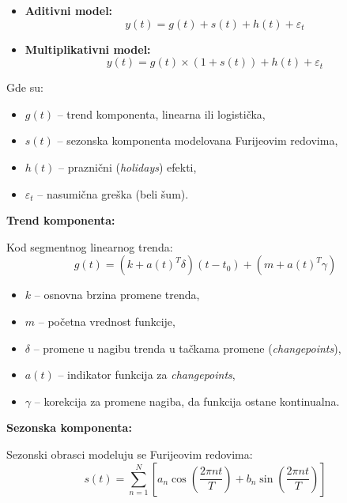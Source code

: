 \documentclass[12pt]{article}
\begin{document}
\begin{itemize}
    \item \textbf{Aditivni model:}
    \begin{equation}
        y(t) = g(t) + s(t) + h(t) + \varepsilon_t
    \end{equation}
    
    \item \textbf{Multiplikativni model:}
    \begin{equation}
        y(t) = g(t) \times (1 + s(t)) + h(t) + \varepsilon_t
    \end{equation}
\end{itemize}

Gde su:
\begin{itemize}
    \item $g(t)$ -- trend komponenta, linearna ili logistička,
    \item $s(t)$ -- sezonska komponenta modelovana Furijeovim redovima,
    \item $h(t)$ -- praznični (\textit{holidays}) efekti,
    \item $\varepsilon_t$ -- nasumična greška (beli šum).
\end{itemize}

\textbf{Trend komponenta:}

Kod segmentnog linearnog trenda:
\begin{equation}
g(t) = (k + a(t)^T \delta) (t - t_0) + (m + a(t)^T \gamma)
\end{equation}

\begin{itemize}
    \item $k$ -- osnovna brzina promene trenda,
    \item $m$ -- početna vrednost funkcije,
    \item $\delta$ -- promene u nagibu trenda u tačkama promene (\textit{changepoints}),
    \item $a(t)$ -- indikator funkcija za \textit{changepoints},
    \item $\gamma$ -- korekcija za promene nagiba, da funkcija ostane kontinualna.
\end{itemize}

\textbf{Sezonska komponenta:}

Sezonski obrasci modeluju se Furijeovim redovima:
\begin{equation}
s(t) = \sum_{n=1}^{N} \left[ a_n \cos \left( \frac{2 \pi n t}{T} \right) + b_n \sin \left( \frac{2 \pi n t}{T} \right) \right]
\end{equation}
\end{document}
